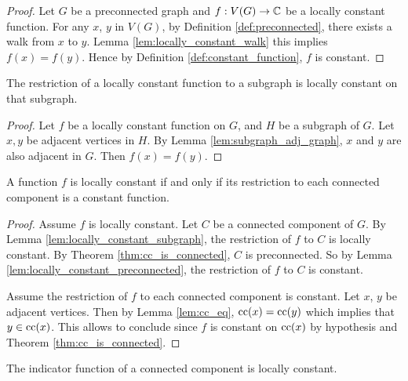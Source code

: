 \begin{proof}
  Let $G$ be a preconnected graph and $f : V(G) \rightarrow \mathbb{C}$ be a locally
  constant function.
  For any $x$, $y$ in $V(G)$, by Definition \ref{def:preconnected}, there
  exists a walk from $x$ to $y$. Lemma \ref{lem:locally_constant_walk}
  this implies $f(x)=f(y)$. Hence by Definition \ref{def:constant_function},
  $f$ is constant.
\end{proof}

\begin{lemma}
  \label{lem:locally_constant_subgraph}
  The restriction of a locally constant function
  to a subgraph is locally constant on that subgraph.
\end{lemma}

\begin{proof}
  Let $f$ be a locally constant function on $G$, and $H$ be a subgraph of $G$.
  Let $x, y$ be adjacent vertices in $H$. By Lemma \ref{lem:subgraph_adj_graph},
  $x$ and $y$ are also adjacent in $G$. Then $f(x)=f(y)$.
\end{proof}

\begin{theorem}
  \label{thm:locally_constant_cc}
  A function $f$ is locally constant if and only if its restriction to each
  connected component is a constant function.
\end{theorem}

\begin{proof}
  Assume $f$ is locally constant. Let $C$ be a connected component of $G$.
  By Lemma \ref{lem:locally_constant_subgraph}, the restriction of $f$ to $C$
  is locally constant.
  By Theorem \ref{thm:cc_is_connected}, $C$ is preconnected.
  So by Lemma \ref{lem:locally_constant_preconnected}, the restriction of $f$ to $C$
  is constant.

  Assume the restriction of $f$ to each connected component is constant.
  Let $x$, $y$ be adjacent vertices. Then by Lemma \ref{lem:cc_eq},
  $\mathrm{cc}(x) = \mathrm{cc}(y)$ which implies that $y \in \mathrm{cc}(x)$. This allows to conclude
  since $f$ is constant on $\mathrm{cc}(x)$
  by hypothesis and Theorem \ref{thm:cc_is_connected}.
\end{proof}

\begin{lemma}
  \label{lem:indicator_cc_loc_const}
  The indicator function of a connected component is locally constant.
\end{lemma}


